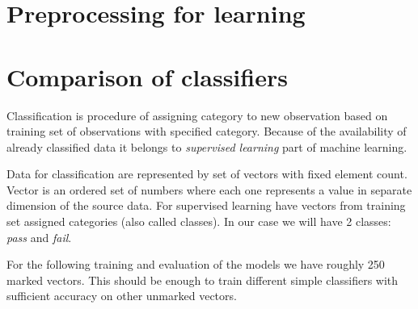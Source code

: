 \section{Preprocessing for learning}
\section{Comparison of classifiers}
Classification is procedure of assigning category to new observation based on
training set of observations with specified category. Because of the
availability of already classified data it belongs to \emph{supervised learning}
part of machine learning.

Data for classification are represented by set of vectors with fixed element
count. Vector is an ordered set of numbers where each one represents a value in
separate dimension of the source data. For supervised learning have vectors from
training set assigned categories (also called classes). In our case we will have
2 classes: \emph{pass} and \emph{fail}.

For the following training and evaluation of the models we have roughly 250
marked vectors. This should be enough to train different simple classifiers with
sufficient accuracy on other unmarked vectors.




